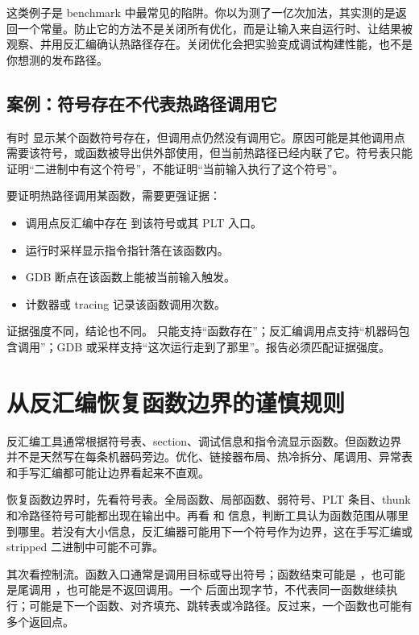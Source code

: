 这类例子是 benchmark 中最常见的陷阱。你以为测了一亿次加法，其实测的是返回一个常量。防止它的方法不是关闭所有优化，而是让输入来自运行时、让结果被观察、并用反汇编确认热路径存在。关闭优化会把实验变成调试构建性能，也不是你想测的发布路径。

\subsection{案例：符号存在不代表热路径调用它}

有时  显示某个函数符号存在，但调用点仍然没有调用它。原因可能是其他调用点需要该符号，或函数被导出供外部使用，但当前热路径已经内联了它。符号表只能证明“二进制中有这个符号”，不能证明“当前输入执行了这个符号”。

要证明热路径调用某函数，需要更强证据：

\begin{itemize}
  \item 调用点反汇编中存在  到该符号或其 PLT 入口。
  \item 运行时采样显示指令指针落在该函数内。
  \item GDB 断点在该函数上能被当前输入触发。
  \item 计数器或 tracing 记录该函数调用次数。
\end{itemize}

证据强度不同，结论也不同。  只能支持“函数存在”；反汇编调用点支持“机器码包含调用”；GDB 或采样支持“这次运行走到了那里”。报告必须匹配证据强度。

\section{从反汇编恢复函数边界的谨慎规则}

反汇编工具通常根据符号表、section、调试信息和指令流显示函数。但函数边界并不是天然写在每条机器码旁边。优化、链接器布局、热冷拆分、尾调用、异常表和手写汇编都可能让边界看起来不直观。

恢复函数边界时，先看符号表。全局函数、局部函数、弱符号、PLT 条目、thunk 和冷路径符号可能都出现在输出中。再看  和  信息，判断工具认为函数范围从哪里到哪里。若没有大小信息，反汇编器可能用下一个符号作为边界，这在手写汇编或 stripped 二进制中可能不可靠。

其次看控制流。函数入口通常是调用目标或导出符号；函数结束可能是 ，也可能是尾调用 ，也可能是不返回调用。一个  后面出现字节，不代表同一函数继续执行；可能是下一个函数、对齐填充、跳转表或冷路径。反过来，一个函数也可能有多个返回点。

